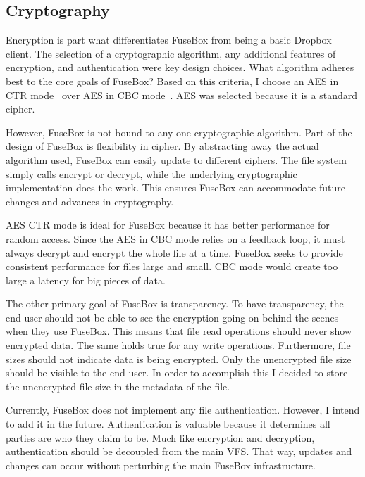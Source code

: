 \documentclass[11pt,twocolumn,letterpaper]{article}
\newcommand{\appname}{FuseBox }
\newcommand{\appnameWOspace}{FuseBox}
\begin{document}
\subsection{Cryptography}
\label{sec:enc}
Encryption is part what differentiates \appname from being a basic
Dropbox client. The selection of a cryptographic algorithm,
any additional features of encryption, and authentication were key design choices. What
algorithm adheres best to the core goals of \appnameWOspace? Based on
this criteria, I choose an AES in CTR mode~\cite{AESCTR} over AES in
CBC mode~\cite{CBC}. AES was selected because it is a standard cipher. 
\par However, \appname is not bound to any one cryptographic algorithm. 
Part of the design of \appname is
flexibility in cipher. By abstracting away the actual algorithm used,
\appname can easily update to different ciphers. The file system
simply calls encrypt or decrypt, while the underlying cryptographic
implementation does the work. This ensures \appname can accommodate 
future changes and advances in cryptography. 
\par AES CTR mode is ideal for \appname because it has better
performance for random access. Since the AES in CBC mode relies on a 
feedback loop, it must always decrypt and encrypt
the whole file at a time. \appname seeks to provide consistent
performance for files large and small. CBC mode would create
too large a latency for big pieces of data.   
\par The other primary goal of \appname is transparency. To have
transparency, the end user should not be able to see the encryption going on
behind the scenes when they use \appnameWOspace. This means that file read
operations should never show encrypted data. The same holds true for
any write operations. Furthermore, file sizes should not indicate 
data is being encrypted. Only the unencrypted file size should be
visible to the end user. In order to
accomplish this I decided to store the unencrypted file size in the
metadata of the file. 
\par Currently, \appname does not implement any file
authentication. However, I intend to add it in the future. Authentication is
valuable because it determines all parties are who they claim to
be. Much like encryption and decryption, authentication should be
decoupled from the main VFS. That way, updates and changes 
can occur without perturbing the main \appname infrastructure. 
\end{document}
